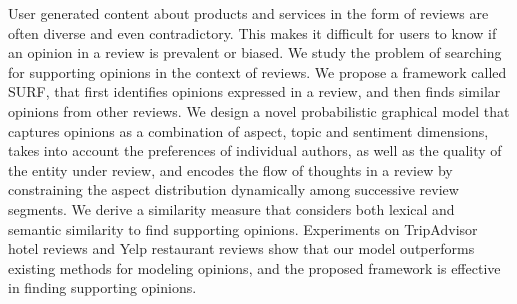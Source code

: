 User generated content about products and services in the form of reviews are often diverse and even contradictory. This makes it difficult for users to know if an opinion in a review is prevalent or biased. We study the problem of searching for supporting opinions in the context of reviews. We propose a framework called SURF, that first identifies opinions expressed in a review, and then finds similar opinions from other reviews. We design a novel probabilistic graphical model that captures opinions as a combination of aspect, topic and sentiment dimensions, takes into account the preferences of individual authors, as well as the quality of the  entity under review, and encodes the flow of thoughts in a review by constraining the aspect distribution dynamically among successive review segments. We derive a similarity measure that  considers both lexical and semantic similarity to find supporting opinions. Experiments on TripAdvisor hotel reviews and Yelp restaurant reviews  show that  our model outperforms  existing methods for modeling opinions, and the proposed framework is effective in finding supporting opinions.
